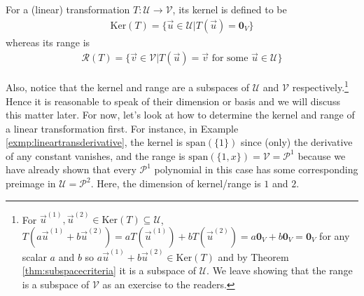 \begin{defn}
\label{defn:kernelrange}
For a (linear) transformation $T: \mathcal{U} \to \mathcal{V}$, its kernel is defined to be
\begin{align}
\text{Ker}(T) = \{\vec{u} \in \mathcal{U} | T(\vec{u}) = \textbf{0}_V\}
\end{align}
whereas its range is
\begin{align}
\mathcal{R}(T) = \{\vec{v} \in \mathcal{V} | T(\vec{u}) = \vec{v} \text{ for some } \vec{u} \in \mathcal{U}\}    
\end{align}
\end{defn}
Also, notice that the kernel and range are a subspaces of $\mathcal{U}$ and $\mathcal{V}$ respectively.\footnote{For $\vec{u}^{(1)}, \vec{u}^{(2)} \in \text{Ker}(T) \subseteq \mathcal{U}$, $T(a\vec{u}^{(1)} + b\vec{u}^{(2)}) = aT(\vec{u}^{(1)}) + bT(\vec{u}^{(2)}) = a\textbf{0}_V + b\textbf{0}_V = \textbf{0}_V$ for any scalar $a$ and $b$ so $a\vec{u}^{(1)} + b\vec{u}^{(2)} \in \text{Ker}(T)$ and by Theorem \ref{thm:subspacecriteria} it is a subspace of $\mathcal{U}$. We leave showing that the range is a subspace of $\mathcal{V}$ as an exercise to the readers.} Hence it is reasonable to speak of their dimension or basis and we will discuss this matter later. For now, let's look at how to determine the kernel and range of a linear transformation first. For instance, in Example \ref{exmp:lineartransderivative}, the kernel is $\text{span}(\{1\})$ since (only) the derivative of any constant vanishes, and the range is $\text{span}(\{1, x\}) = \mathcal{V} = \mathcal{P}^1$ because we have already shown that every $\mathcal{P}^1$ polynomial in this case has some corresponding preimage in $\mathcal{U} = \mathcal{P}^2$. Here, the dimension of kernel/range is $1$ and $2$.

